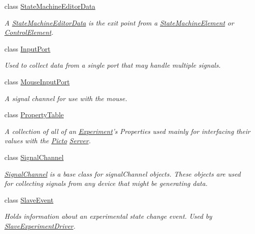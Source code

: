 \begin{DoxyCompactItemize}
class \hyperlink{class_picto_1_1_state_machine_editor_data}{State\-Machine\-Editor\-Data}
\begin{DoxyCompactList}\small\item\em A \hyperlink{class_picto_1_1_state_machine_editor_data}{State\-Machine\-Editor\-Data} is the exit point from a \hyperlink{class_picto_1_1_state_machine_element}{State\-Machine\-Element} or \hyperlink{class_picto_1_1_control_element}{Control\-Element}. \end{DoxyCompactList}\item 
class \hyperlink{class_picto_1_1_input_port}{Input\-Port}
\begin{DoxyCompactList}\small\item\em Used to collect data from a single port that may handle multiple signals. \end{DoxyCompactList}\item 
class \hyperlink{class_picto_1_1_mouse_input_port}{Mouse\-Input\-Port}
\begin{DoxyCompactList}\small\item\em A signal channel for use with the mouse. \end{DoxyCompactList}\item 
class \hyperlink{class_picto_1_1_property_table}{Property\-Table}
\begin{DoxyCompactList}\small\item\em A collection of all of an \hyperlink{class_picto_1_1_experiment}{Experiment}'s Properties used mainly for interfacing their values with the \hyperlink{namespace_picto}{Picto} \hyperlink{class_server}{Server}. \end{DoxyCompactList}\item 
class \hyperlink{class_picto_1_1_signal_channel}{Signal\-Channel}
\begin{DoxyCompactList}\small\item\em \hyperlink{class_picto_1_1_signal_channel}{Signal\-Channel} is a base class for signal\-Channel objects. These objects are used for collecting signals from any device that might be generating data. \end{DoxyCompactList}\item 
class \hyperlink{class_picto_1_1_slave_event}{Slave\-Event}
\begin{DoxyCompactList}\small\item\em Holds information about an experimental state change event. Used by \hyperlink{class_picto_1_1_slave_experiment_driver}{Slave\-Experiment\-Driver}. \end{DoxyCompactList}\item 

\end{DoxyCompactItemize}
